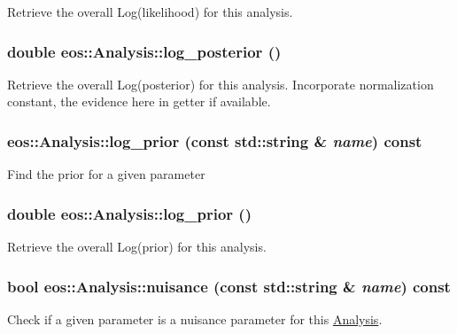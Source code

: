 Retrieve the overall Log(likelihood) for this analysis. \hypertarget{classeos_1_1Analysis_a8919114802de94afc42068d87346a525}{
\subsubsection[{log\_\-posterior}]{\setlength{\rightskip}{0pt plus 5cm}double eos::Analysis::log\_\-posterior ()}}
\label{classeos_1_1Analysis_a8919114802de94afc42068d87346a525}
Retrieve the overall Log(posterior) for this analysis. Incorporate normalization constant, the evidence here in getter if available. \hypertarget{classeos_1_1Analysis_ad6647f4d8a1937db18cbce2d33170c55}{
\subsubsection[{log\_\-prior}]{ eos::Analysis::log\_\-prior (const std::string \& {\em name}) const}}
\label{classeos_1_1Analysis_ad6647f4d8a1937db18cbce2d33170c55}
Find the prior for a given parameter \hypertarget{classeos_1_1Analysis_a521333679365bc779d1136701d31e35d}{
\subsubsection[{log\_\-prior}]{\setlength{\rightskip}{0pt plus 5cm}double eos::Analysis::log\_\-prior ()}}
\label{classeos_1_1Analysis_a521333679365bc779d1136701d31e35d}


Retrieve the overall Log(prior) for this analysis. \hypertarget{classeos_1_1Analysis_a52ed491bbea6d966ea4f8a746b9e980d}{
\subsubsection[{nuisance}]{\setlength{\rightskip}{0pt plus 5cm}bool eos::Analysis::nuisance (const std::string \& {\em name}) const}}
\label{classeos_1_1Analysis_a52ed491bbea6d966ea4f8a746b9e980d}
Check if a given parameter is a nuisance parameter for this \hyperlink{classeos_1_1Analysis}{Analysis}.


